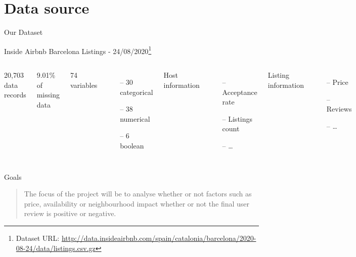 \section{Data source}
\begin{frame}{Our Dataset}
\begin{center}
    Inside Airbnb Barcelona Listings - 24/08/2020\footnote[frame]{Dataset URL: \url{http://data.insideairbnb.com/spain/catalonia/barcelona/2020-08-24/data/listings.csv.gz}}

\vspace{5 mm}

\begin{columns}[t]
    20,703 data records
    
    9.01\% of missing data
    
    74 variables
    \small
    \begin{itemize}[topsep=0pt]
        \itemsep-0.25em
    	\item[--] 30 categorical
    	\item[--] 38 numerical
    	\item[--] 6 boolean
    \end{itemize}
    \normalsize
    
    Host information
    \small
    \begin{itemize}[topsep=0pt]
        \itemsep-0.5em
    	\item[--] Acceptance rate
    	\item[--] Listings count
    	\item[--] \dots
    \end{itemize}
    \normalsize
    Listing information
    \small
    \begin{itemize}[topsep=0pt]
        \itemsep-0.5em
    	\item[--] Price
    	\item[--] Reviews
    	\item[--] \dots
    \end{itemize}
    \normalsize
\end{columns}

\end{center}
\end{frame}


\begin{frame}{Goals}
\begin{quote}
The focus of the project will be to analyse whether or not factors
such as price, availability or neighbourhood impact whether or not the final
user review is positive or negative.
\end{quote}
\end{frame}


